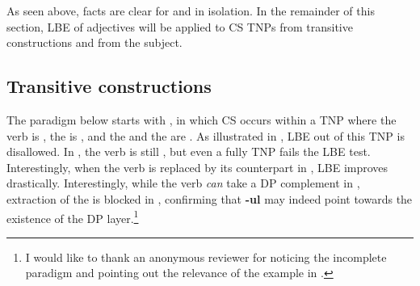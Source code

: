 \documentclass[output=paper,hidelinks,newtxmath,]{langscibook}
\begin{document}
\noindent As seen above, facts are clear for  and  in isolation. In the remainder of this section, LBE of adjectives will be applied to CS TNPs from transitive constructions and from the subject.

\subsection{Transitive constructions}\label{15:s5.2}

The paradigm below starts with , in which CS occurs within a TNP where the verb is , the  is , and the  and the  are . As illustrated in , LBE out of this TNP is disallowed. In , the verb is still , but even a fully  TNP fails the LBE test. Interestingly, when the  verb is replaced by its  counterpart in , LBE improves drastically. Interestingly, while the  verb \textit{can} take a DP complement in , extraction of the  is blocked in , confirming that \textbf{-ul} may indeed point towards the existence of the DP layer.\footnote{\label{15:fn9}I would like to thank an anonymous reviewer for noticing the incomplete paradigm and pointing out the relevance of the example in .}

\ea \label{15:ex16}
	\z
\z

\ea \label{15:ex17}
	\z
\z
\end{document}
